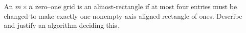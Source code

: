 An $m\times n$ zero--one grid is an almost-rectangle if at most four entries must be changed to make exactly one nonempty axis-aligned rectangle of ones. Describe and justify an algorithm deciding this.
